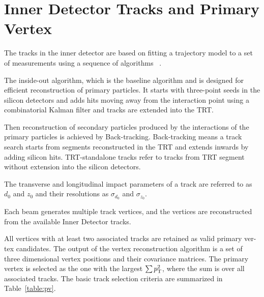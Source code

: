 \section{Inner Detector Tracks and  Primary Vertex}
\label{sec:pv}
\par The tracks in the inner detector are based on fitting a trajectory model to a set of measurements using a sequence of algorithms
~\cite{Cornelissen:1020106}.		 	
\par The inside-out algorithm, which is the baseline algorithm and is designed for efficient reconstruction of primary particles. 
It starts with three-point seeds in the silicon detectors and adds hits moving away from the interaction point using a combinatorial Kalman filter 
and tracks are extended into the TRT.
\par Then reconstruction of secondary particles produced by the interactions of the primary particles is achieved by Back-tracking. 
Back-tracking means a track search starts from segments reconstructed in the TRT and extends inwards by adding silicon hits. 
TRT-standalone tracks refer to tracks from TRT segment without extension into the silicon detectors.					
\par The transverse and longitudinal impact parameters of a track are referred to as $d_0$ and $z_0$ and their resolutions as $\sigma_{d_0}$ 
and $\sigma_{z_0}$. 
\par Each beam generates multiple track vertices, and the vertices are reconstructed from the available Inner Detector tracks.
\par All vertices with at least two associated tracks are retained as valid primary ver- tex candidates. 
The output of the vertex reconstruction algorithm is a set of three dimensional vertex positions and their covariance matrices. 
The primary vertex is selected as the one with the largest $\sum p_{\mathrm{T}}^2$, where the sum is over all associated tracks. 
The basic track selection criteria are summarized in Table~\ref{table:pv}.

